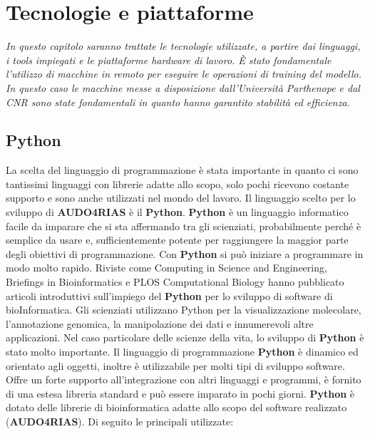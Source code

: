 \chapter{Tecnologie e piattaforme}
\textit{In questo capitolo saranno trattate le tecnologie utilizzate, a partire dai linguaggi, i tools impiegati e le piattaforme hardware di lavoro. È stato fondamentale l’utilizzo di macchine in remoto per eseguire le operazioni di training del modello. In questo caso le macchine messe a disposizione dall’Università Parthenope e dal CNR sono state fondamentali in quanto hanno garantito stabilità ed efficienza.}

\vskip 1cm

\section{Python}
La scelta del linguaggio di programmazione è stata importante in quanto ci sono tantissimi linguaggi con librerie adatte allo scopo, solo pochi ricevono costante supporto e sono anche utilizzati nel mondo del lavoro.\newline
Il linguaggio scelto per lo sviluppo di \textbf{AUDO4RIAS} è il \textbf{Python}.\newline
\textbf{Python} è un linguaggio informatico facile da imparare che si sta affermando tra gli scienziati, probabilmente perché è semplice da usare e, sufficientemente potente per raggiungere la maggior parte degli obiettivi di programmazione. Con \textbf{Python} si può iniziare a programmare in modo molto rapido. Riviste come Computing in Science and Engineering, Briefings in Bioinformatics e PLOS Computational Biology hanno pubblicato articoli introduttivi sull'impiego del \textbf{Python} per lo sviluppo di software di bioInformatica. Gli scienziati utilizzano Python per la visualizzazione molecolare, l'annotazione genomica, la manipolazione dei dati e innumerevoli altre applicazioni. Nel caso particolare delle scienze della vita, lo sviluppo di \textbf{Python} è stato molto importante.\cite{bassi2016python}\newline
Il linguaggio di programmazione \textbf{Python} è dinamico ed orientato agli oggetti, inoltre è utilizzabile per molti tipi  di sviluppo software. Offre un forte supporto all'integrazione con altri linguaggi e programmi, è fornito di una estesa libreria standard e può essere imparato in pochi giorni.\newline
\textbf{Python} è dotato delle librerie di bioinformatica adatte allo scopo del software realizzato (\textbf{AUDO4RIAS}). Di seguito le principali utilizzate:


